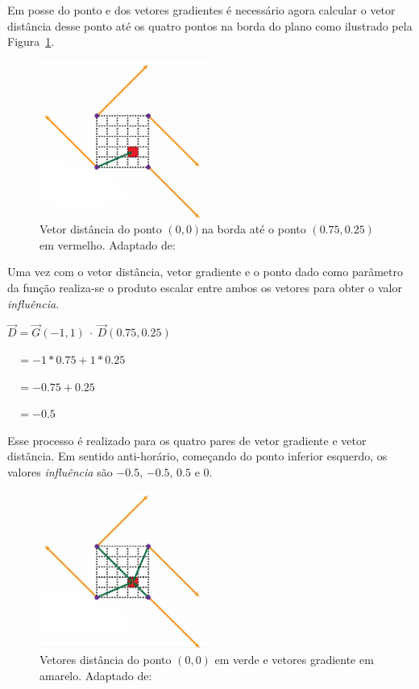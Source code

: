 \documentclass[12pt, 
openright, 
oneside, 
a4paper,    
brazil]{facom-ufu-abntex2}
\begin{document}
Em posse do ponto e dos vetores gradientes é necessário agora calcular o vetor distância desse ponto até os quatro pontos na borda do plano como ilustrado pela Figura~\ref{fig:perlinGradientsAndOneDistance}.

\begin{figure}[H]
	\centering
	\includegraphics[width=15em]{imagens/perlinGradientsAndOneDistance.png}
	\caption{Vetor distância do ponto $(0,0)$na borda até o ponto $(0.75,0.25)$ em vermelho. Adaptado de: \cite{Fataho}}
	\label{fig:perlinGradientsAndOneDistance}
\end{figure}

Uma vez com o vetor distância, vetor gradiente e o ponto dado como parâmetro da função realiza-se o produto escalar entre ambos os vetores para obter o valor \textit{influência}.

$\vec{D} = \vec{G}(-1,1) ~\cdotp ~ \vec{D}(0.75, 0.25)$

$~~~~ = -1 * 0.75 + 1 *0.25$

$~~~~ = -0.75 + 0.25$

$~~~~ = -0.5$

Esse processo é realizado para os quatro pares de vetor gradiente e vetor distância. Em sentido anti-horário, começando do ponto inferior esquerdo, os valores \textit{influência} são $-0.5$, $-0.5$, $0.5$ e $0$.
\begin{figure}[H]
	\centering
	\includegraphics[width=15em]{imagens/perlinGradientsAndDistances.png}
	\caption{Vetores distância do ponto $(0,0)$ em verde e vetores gradiente em amarelo. Adaptado de: \cite{Fataho}}
\end{figure}
\end{document}
